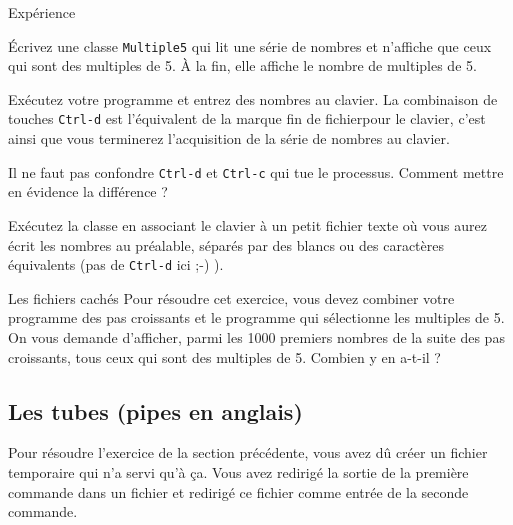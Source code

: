 \documentclass[a4paper,11pt]{article}
\begin{document}
		\begin{Tutoriel}{Exp\'erience} 
				\begin{steps}
					\item Écrivez une classe \verb_Multiple5_ qui lit une série de nombres et n'affiche que ceux qui sont des multiples de 5. 
					À la fin, elle affiche le nombre de multiples de 5.
			
					\item Exécutez votre programme et entrez des nombres au clavier.
						La combinaison de touches \verb_Ctrl-d_ est l'\'equivalent de la marque \guillemotleft fin de fichier\guillemotright  pour le clavier,
						c'est ainsi que vous terminerez l'acquisition de la s\'erie de nombres au clavier.
					
					\item Il ne faut pas confondre \verb_Ctrl-d_ et \verb_Ctrl-c_
						qui tue le processus. Comment mettre en \'evidence la diff\'erence ?
					
					\item Ex\'ecutez la classe en associant le clavier 
						\`a un petit fichier texte o\`u vous aurez \'ecrit les nombres au pr\'ealable,
						s\'epar\'es par des blancs ou des caract\`eres \'equivalents (pas de \verb_Ctrl-d_ ici ;-) ).						
					
				\end{steps}
		\end{Tutoriel}
				
			
		\begin{Exercice}{Les fichiers cach\'es} 
			Pour r\'esoudre cet exercice, vous devez combiner votre programme des pas croissants
			et le programme qui s\'electionne les multiples de 5. On vous demande d'afficher,
			parmi les 1000 premiers nombres de la suite des pas croissants, tous ceux qui sont des multiples de 5.
			Combien y en a-t-il ?
		\end{Exercice}
            		
        \subsection{Les tubes (pipes en anglais)}
Pour r\'esoudre l'exercice de la section pr\'ec\'edente, vous avez d\^u cr\'eer un fichier
temporaire qui n'a servi qu'\`a \c ca. Vous avez redirig\'e la sortie de la premi\`ere commande dans un fichier et
redirig\'e ce fichier comme entr\'ee de la seconde commande.
					
\end{document}
